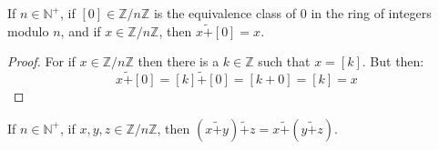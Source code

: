 \documentclass{article}                                                        %
\begin{document}
            \begin{theorem}
                \label{thm:Equiv_Class_of_0_is_Add_Identity_Mod_n}%
                If $n\in\mathbb{N}^{+}$, if $[0]\in\mathbb{Z}/n\mathbb{Z}$ is
                the equivalence class of 0 in the ring of integers modulo $n$,
                and if $x\in\mathbb{Z}/n\mathbb{Z}$, then $x\tilde{+}[0]=x$.
            \end{theorem}
            \begin{proof}
                For if $x\in\mathbb{Z}/n\mathbb{Z}$ then there is a
                $k\in\mathbb{Z}$ such that $x=[k]$. But then:
                \begin{equation}
                    x\tilde{+}[0]=[k]\tilde{+}[0]=[k+0]=[k]=x
                \end{equation}
            \end{proof}
            \begin{theorem}
                \label{thm:Mod_Add_is_Assoc}%
                If $n\in\mathbb{N}^{+}$, if $x,y,z\in\mathbb{Z}/n\mathbb{Z}$,
                then $(x\tilde{+}y)\tilde{+}z=x\tilde{+}(y\tilde{+}z)$.
            \end{theorem}
\end{document}
